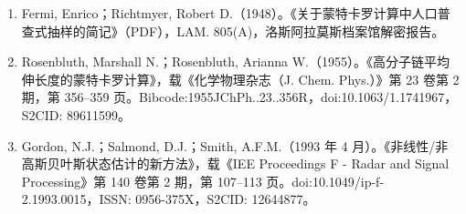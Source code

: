 \begin{enumerate}
\item Fermi, Enrico；Richtmyer, Robert D.（1948）。《关于蒙特卡罗计算中人口普查式抽样的简记》（PDF），LAM. 805(A)，洛斯阿拉莫斯档案馆解密报告。
\item Rosenbluth, Marshall N.；Rosenbluth, Arianna W.（1955）。《高分子链平均伸长度的蒙特卡罗计算》，载《化学物理杂志（J. Chem. Phys.）》第 23 卷第 2 期，第 356–359 页。Bibcode:1955JChPh..23..356R，doi:10.1063/1.1741967，S2CID: 89611599。
\item Gordon, N.J.；Salmond, D.J.；Smith, A.F.M.（1993 年 4 月）。《非线性/非高斯贝叶斯状态估计的新方法》，载《IEE Proceedings F - Radar and Signal Processing》第 140 卷第 2 期，第 107–113 页。doi:10.1049/ip-f-2.1993.0015，ISSN: 0956-375X，S2CID: 12644877。
\end{enumerate}
